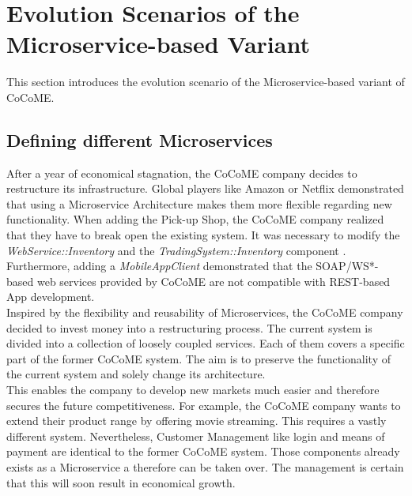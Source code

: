
\section{Evolution Scenarios of the Microservice-based Variant}
This section introduces the evolution scenario of the Microservice-based variant of CoCoME.
\subsection{Defining different Microservices}
After a year of economical stagnation, the CoCoME company decides to restructure its infrastructure. Global players like Amazon or Netflix demonstrated that using a Microservice Architecture makes them more flexible regarding new functionality. When adding the Pick-up Shop, the CoCoME company realized that they have to break open the existing system. It was necessary to modify the \textit{WebService::Inventory} and the \textit{TradingSystem::Inventory} component \cite{HeinrichRostamiReussner2016_1000052688}. Furthermore, adding a \textit{MobileAppClient} demonstrated that the SOAP/WS*-based web services provided by CoCoME are not compatible with REST-based App development.
\\
Inspired by the flexibility and reusability of Microservices, the CoCoME company decided to invest money into a restructuring process. The current system is divided into a collection of loosely coupled services. Each of them covers a specific part of the former CoCoME system. The aim is to preserve the functionality of the current system and solely change its architecture.
\\
 This enables the company to develop new markets much easier and therefore secures the future competitiveness. For example, the CoCoME company wants to extend their product range by offering movie streaming. This requires a vastly different system. Nevertheless, Customer Management like login and means of payment are identical to the former CoCoME system. Those components already exists as a Microservice a therefore can be taken over. The management is certain that this will soon result in economical growth.








	
	

